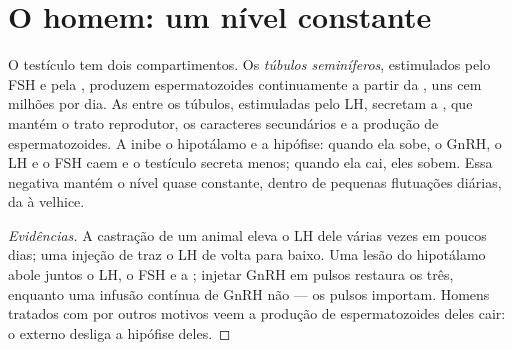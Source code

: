 \section{O homem: um nível constante}

\begin{proposition}\label{prop:g11:hormones-and-reproduction:male}
O testículo tem dois compartimentos. Os \emph{túbulos seminíferos},
estimulados pelo FSH e pela , produzem espermatozoides
continuamente a partir da , uns cem milhões por dia. As
 entre os túbulos, estimuladas pelo LH, secretam a
\emph{}, que mantém o trato reprodutor, os caracteres
secundários e a produção de espermatozoides. A  inibe o
hipotálamo e a hipófise: quando ela sobe, o GnRH, o LH e o FSH caem e o
testículo secreta menos; quando ela cai, eles sobem. Essa
 negativa mantém o nível quase constante, dentro de
pequenas flutuações diárias, da  à velhice.
\end{proposition}
\begin{proof}[Evidências]
A castração de um animal eleva o LH dele várias vezes em poucos dias;
uma injeção de  traz o LH de volta para baixo. Uma lesão do
hipotálamo abole juntos o LH, o FSH e a ; injetar GnRH em
pulsos restaura os três, enquanto uma infusão contínua de GnRH não ---
os pulsos importam. Homens tratados com  por outros motivos
veem a produção de espermatozoides deles cair: o  externo
desliga a hipófise deles.
\end{proof}

